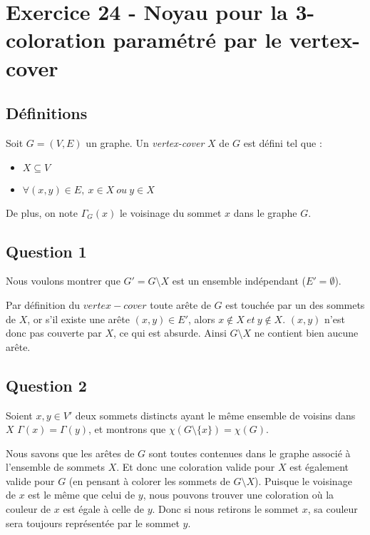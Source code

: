 
\section{Exercice 24 - Noyau pour la 3-coloration paramétré par le vertex-cover}\label{ex16}

\subsection{Définitions}\label{ex24_def}
Soit $G = (V,E)$ un graphe. Un {\em vertex-cover} $X$ de $G$ est défini tel que :
\begin{itemize}
	\item $X \subseteq V$
	\item $\forall (x,y) \in E,\ x \in X\ ou\ y \in X$\\
\end{itemize}
De plus, on note $\Gamma_G(x)$ le voisinage du sommet $x$ dans le graphe
$G$.

\subsection{Question 1}\label{ex24_q1}
Nous voulons montrer que $G' = G \setminus X$ est un ensemble indépendant ($E' =
\emptyset$).

Par définition du $vertex-cover$ toute arête de $G$ est touchée par un des sommets de
$X$, or 
s'il existe une arête $(x,y) \in E'$, alors $x \notin X\ et\ y \notin X$.
$(x,y)$ n'est donc pas couverte par $X$,
ce qui est absurde.
Ainsi $G \setminus X$ ne contient bien aucune arête.

\subsection{Question 2}\label{ex24_q2}
Soient $x,y \in V'$ deux sommets distincts ayant le même ensemble de voisins dans $X$
$\Gamma(x) = \Gamma(y)$, et
montrons que $\chi(G \setminus \{x\}) = \chi(G)$.

Nous savons que les arêtes de $G$ sont toutes contenues dans le graphe associé à
l'ensemble de sommets $X$. Et donc une coloration valide pour $X$ est également valide
pour $G$ (en pensant à colorer les sommets de $G \setminus X$).
Puisque le voisinage de $x$ est le même que celui de $y$, nous pouvons trouver une
coloration où la couleur de $x$ est égale à celle de $y$.
Donc si nous retirons le sommet $x$, sa couleur sera toujours représentée par le
sommet $y$.

